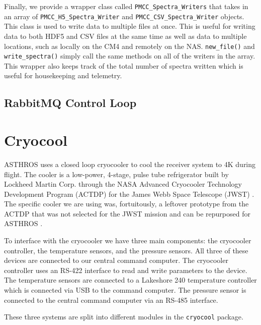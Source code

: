 Finally, we provide a wrapper class called \texttt{PMCC\_Spectra\_Writers} that takes in an array of \texttt{PMCC\_H5\_Spectra\_Writer} and \texttt{PMCC\_CSV\_Spectra\_Writer} objects.
This class is used to write data to multiple files at once. 
This is useful for writing data to both HDF5 and CSV files at the same time as well as data to multiple locations, such as locally on the CM4 and remotely on the NAS. 
\texttt{new\_file()} and \texttt{write\_spectra()} simply call the same methods on all of the writers in the array.
This wrapper also keeps track of the total number of spectra written which is useful for housekeeping and telemetry. 

\subsection{RabbitMQ Control Loop}

\section{Cryocool}
ASTHROS uses a closed loop cryocooler to cool the receiver system to 4K during flight.
The cooler is a low-power, 4-stage, pulse tube refrigerator built by Lockheed Martin Corp. through the NASA Advanced Cryocooler Technology Development Program (ACTDP) for the James Webb Space Telescope (JWST) \citep{olson2005lockheed} \citep{coulter2003nasa}.
The specific cooler we are using was, fortuitously, a leftover prototype from the ACTDP that was not selected for the JWST mission and can be repurposed for ASTHROS \citep{kawamuraterahertz}.

To interface with the cryocooler we have three main components: the cryocooler controller, the temperature sensors, and the pressure sensors.
All three of these devices are connected to our central command computer. 
The cryocooler controller uses an RS-422 interface to read and write parameters to the device.
The temperature sensors are connected to a Lakeshore 240 temperature controller which is connected via USB to the command computer.
The pressure sensor is connected to the central command computer via an RS-485 interface.

These three systems are split into different modules in the \texttt{cryocool} package.

